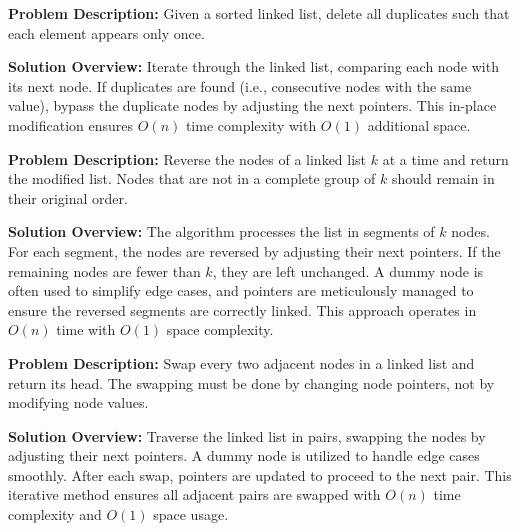 
\textbf{Problem Description:}  
Given a sorted linked list, delete all duplicates such that each element appears only once.

\textbf{Solution Overview:}  
Iterate through the linked list, comparing each node with its next node. If duplicates are found (i.e., consecutive nodes with the same value), bypass the duplicate nodes by adjusting the next pointers. This in-place modification ensures \(O(n)\) time complexity with \(O(1)\) additional space.


\textbf{Problem Description:}  
Reverse the nodes of a linked list \(k\) at a time and return the modified list. Nodes that are not in a complete group of \(k\) should remain in their original order.

\textbf{Solution Overview:}  
The algorithm processes the list in segments of \(k\) nodes. For each segment, the nodes are reversed by adjusting their next pointers. If the remaining nodes are fewer than \(k\), they are left unchanged. A dummy node is often used to simplify edge cases, and pointers are meticulously managed to ensure the reversed segments are correctly linked. This approach operates in \(O(n)\) time with \(O(1)\) space complexity.


\textbf{Problem Description:}  
Swap every two adjacent nodes in a linked list and return its head. The swapping must be done by changing node pointers, not by modifying node values.

\textbf{Solution Overview:}  
Traverse the linked list in pairs, swapping the nodes by adjusting their next pointers. A dummy node is utilized to handle edge cases smoothly. After each swap, pointers are updated to proceed to the next pair. This iterative method ensures all adjacent pairs are swapped with \(O(n)\) time complexity and \(O(1)\) space usage.

